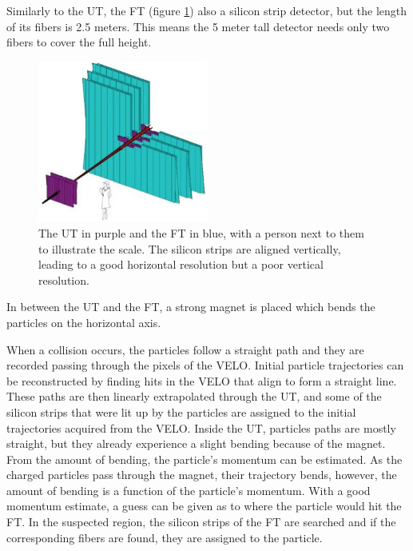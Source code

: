 \documentclass[12pt]{article}
\begin{document}
Similarly to the UT, the FT (figure \ref{fig_detector_ut_ft_drawing}) also a silicon strip detector, but the length of its fibers is 2.5 meters. This means the 5 meter tall detector needs only two fibers to cover the full height.

\begin{figure}[H]
	\begin{center}
		\includegraphics[width=0.5\textwidth]{detector_ut_ft_drawing}
	\end{center}
	\caption[The UT and FT detectors, schematic view]{The UT in purple and the FT in blue, with a person next to them to illustrate the scale. The silicon strips are aligned vertically, leading to a good horizontal resolution but a poor vertical resolution. \cite{tracker_image}}
	\label{fig_detector_ut_ft_drawing}
\end{figure}

In between the UT and the FT, a strong magnet is placed which bends the particles on the horizontal axis.

When a collision occurs, the particles follow a straight path and they are recorded passing through the pixels of the VELO. Initial particle trajectories can be reconstructed by finding hits in the VELO that align to form a straight line. These paths are then linearly extrapolated through the UT, and some of the silicon strips that were lit up by the particles are assigned to the initial trajectories acquired from the VELO. Inside the UT, particles paths are mostly straight, but they already experience a slight bending because of the magnet. From the amount of bending, the particle's momentum can be estimated. As the charged particles pass through the magnet, their trajectory bends, however, the amount of bending is a function of the particle's momentum. With a good momentum estimate, a guess can be given as to where the particle would hit the FT. In the suspected region, the silicon strips of the FT are searched and if the corresponding fibers are found, they are assigned to the particle.
\end{document}
